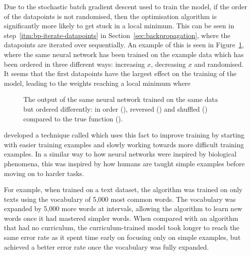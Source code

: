 Due to the stochastic batch gradient descent used to train the model, if the order of the datapoints is not randomised, then the optimisation algorithm is significantly more likely to get stuck in a local minimum.
This can be seen in step~\ref{itm:bp-iterate-datapoints} in Section~\ref{sec:backpropagation}, where the datapoints are iterated over sequentially.
An example of this is seen in Figure~\ref{fig:compare-order}, where the same neural network has been trained on the example data which has been ordered in three different ways: increasing \(x\), decreasing \(x\) and randomised.
It seems that the first datapoints have the largest effect on the training of the model, leading to the weights reaching a local minimum where 

\begin{figure}[htbp]
	\centering
	
	\caption{The output of the same neural network trained on the same data but ordered differently: in order (\inordercolour), reversed (\reversedcolour) and shuffled (\shuffledcolour) compared to the true function (\truthcolour).}
	\label{fig:compare-order}
\end{figure}

\textcite{bengio2009} developed a technique called  which uses this fact to improve training by starting with easier training examples and slowly working towards more difficult training examples.
In a similar way to how neural networks were inspired by biological phenomena, this was inspired by how humans are taught simple examples before moving on to harder tasks.

For example, when trained on a text dataset, the algorithm was trained on only texts using the vocabulary of 5,000 most common words.
The vocabulary was expanded by 5,000 more words at intervals, allowing the algorithm to learn new words once it had mastered simpler words.
When compared with an algorithm that had no curriculum, the curriculum-trained model took longer to reach the same error rate as it spent time early on focusing only on simple examples, but achieved a better error rate once the vocabulary was fully expanded.

